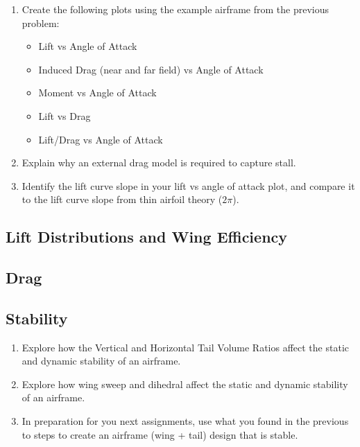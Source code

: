 \documentclass[11pt,twocolumn]{article}
\begin{document}
\begin{enumerate}[label=\roman*.]
	\item Create the following plots using the example airframe from the previous problem:
	\begin{itemize}
		\item Lift vs Angle of Attack
		\item Induced Drag (near and far field) vs Angle of Attack
		\item Moment vs Angle of Attack
		\item Lift vs Drag
		\item Lift/Drag vs Angle of Attack
	\end{itemize}
	\item Explain why an external drag model is required to capture stall.
	\item Identify the lift curve slope in your lift vs angle of attack plot, and compare it to the lift curve slope from thin airfoil theory (\(2\pi\)).
\end{enumerate}

\subsection{Lift Distributions and Wing Efficiency}

\subsection{Drag}

\subsection{Stability}

\begin{enumerate}[label=\roman*.]
	\item Explore how the Vertical and Horizontal Tail Volume Ratios affect the static and dynamic stability of an airframe.
	\item Explore how wing sweep and dihedral affect the static and dynamic stability of an airframe.
	\item In preparation for you next assignments, use what you found in the previous to steps to create an airframe (wing + tail) design that is stable.
\end{enumerate}
\end{document}
